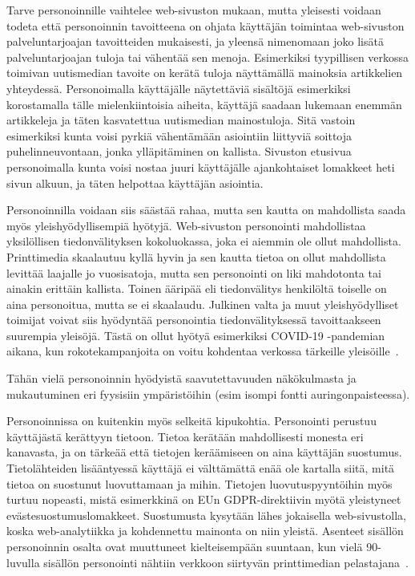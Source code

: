 \documentclass[finnish, 12pt, a4paper, elec, utf8, a-1b, online]{aaltothesis}
\begin{document}
Tarve personoinnille vaihtelee web-sivuston mukaan, mutta yleisesti voidaan
todeta että personoinnin tavoitteena on ohjata käyttäjän toimintaa web-sivuston
palveluntarjoajan tavoitteiden mukaisesti, ja yleensä nimenomaan joko lisätä
palveluntarjoajan tuloja tai vähentää sen menoja. Esimerkiksi tyypillisen
verkossa toimivan uutismedian tavoite on kerätä tuloja näyttämällä mainoksia
artikkelien yhteydessä. Personoimalla käyttäjälle näytettäviä sisältöjä
esimerkiksi korostamalla tälle mielenkiintoisia aiheita, käyttäjä saadaan
lukemaan enemmän artikkeleja ja täten kasvatettua uutismedian mainostuloja. Sitä
vastoin esimerkiksi kunta voisi pyrkiä vähentämään asiointiin liittyviä soittoja
puhelinneuvontaan, jonka ylläpitäminen on kallista. Sivuston etusivua
personoimalla kunta voisi nostaa juuri käyttäjälle ajankohtaiset lomakkeet heti
sivun alkuun, ja täten helpottaa käyttäjän asiointia.

Personoinnilla voidaan siis säästää rahaa, mutta sen kautta on mahdollista saada
myös yleishyödyllisempiä hyötyjä. Web-sivuston personointi mahdollistaa
yksilöllisen tiedonvälityksen kokoluokassa, joka ei aiemmin ole ollut
mahdollista. Printtimedia skaalautuu kyllä hyvin ja sen kautta tietoa on ollut
mahdollista levittää laajalle jo vuosisatoja, mutta sen personointi on liki
mahdotonta tai ainakin erittäin kallista. Toinen ääripää eli tiedonvälitys
henkilöltä toiselle on aina personoitua, mutta se ei skaalaudu. Julkinen valta
ja muut yleishyödylliset toimijat voivat siis hyödyntää personointia
tiedonvälityksessä tavoittaakseen suurempia yleisöjä. Tästä on ollut hyötyä
esimerkiksi COVID-19 -pandemian aikana, kun rokotekampanjoita on voitu kohdentaa
verkossa tärkeille yleisöille~\cite{viite?}.

Tähän vielä personoinnin hyödyistä saavutettavuuden näkökulmasta ja mukautuminen
eri fyysisiin ympäristöihin (esim isompi fontti auringonpaisteessa).

Personoinnissa on kuitenkin myös selkeitä kipukohtia. Personointi perustuu
käyttäjästä kerättyyn tietoon. Tietoa kerätään mahdollisesti monesta eri
kanavasta, ja on tärkeää että tietojen keräämiseen on aina käyttäjän suostumus.
Tietolähteiden lisääntyessä käyttäjä ei välttämättä enää ole kartalla siitä,
mitä tietoa on suostunut luovuttamaan ja mihin. Tietojen luovutuspyyntöihin myös
turtuu nopeasti, mistä esimerkkinä on EUn GDPR-direktiivin myötä yleistyneet
evästesuostumuslomakkeet. Suostumusta kysytään lähes jokaisella
web-sivustolla, koska web-analytiikka ja kohdennettu mainonta on niin
yleistä. Asenteet sisällön personoinnin osalta ovat muuttuneet kielteisempään
suuntaan, kun vielä 90-luvulla sisällön personointi nähtiin verkkoon siirtyvän
printtimedian pelastajana~\cite{adams_1995}.
\end{document}
